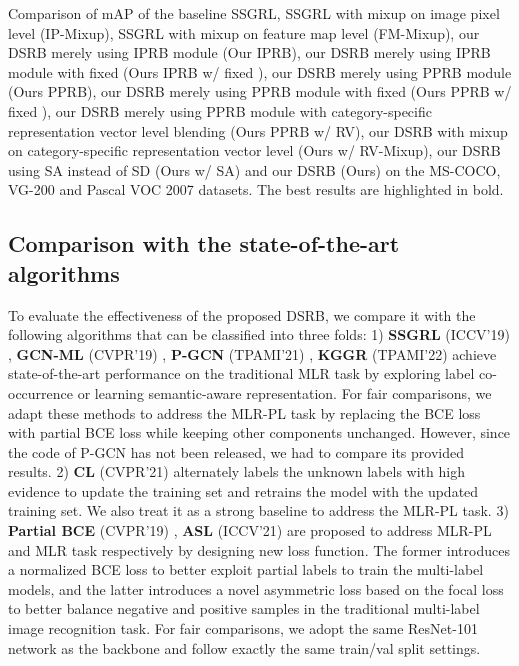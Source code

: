\documentclass[lettersize,journal]{IEEEtran}
\begin{document}
\begin{table*}
  \caption{Comparison of mAP of the baseline SSGRL, SSGRL with mixup on image pixel level (IP-Mixup), SSGRL with mixup on feature map level (FM-Mixup), our DSRB merely using IPRB module (Our IPRB), our DSRB merely using IPRB module with fixed  (Ours IPRB w/ fixed ), our DSRB merely using PPRB module (Ours PPRB), our DSRB merely using PPRB module with fixed  (Ours PPRB w/ fixed ), our DSRB merely using PPRB module with category-specific representation vector level blending (Ours PPRB w/ RV), our DSRB with mixup on category-specific representation vector level (Ours w/ RV-Mixup), our DSRB using SA instead of SD (Ours w/ SA) and our DSRB (Ours) on the MS-COCO, VG-200 and Pascal VOC 2007 datasets. The best results are highlighted in bold.}
  \label{tab:ablation-results}
\end{table*}

\subsection{Comparison with the state-of-the-art algorithms}
To evaluate the effectiveness of the proposed DSRB, we compare it with the following algorithms that can be classified into three folds:  1) \textbf{SSGRL} (ICCV'19) \cite{Chen2019SSGRL}, \textbf{GCN-ML} (CVPR'19) \cite{Chen2019ML-GCN}, \textbf{P-GCN} (TPAMI'21) \cite{Chen2021P-GCN}, \textbf{KGGR} (TPAMI'22) \cite{Chen2022KGGR} achieve state-of-the-art performance on the traditional MLR task by exploring label co-occurrence or learning semantic-aware representation. For fair comparisons, we adapt these methods to address the MLR-PL task by replacing the BCE loss with partial BCE loss while keeping other components unchanged. However, since the code of P-GCN has not been released, we had to compare its provided results. 2) \textbf{CL} (CVPR'21) \cite{Durand2019CVPR} alternately labels the unknown labels with high evidence to update the training set and retrains the model with the updated training set. We also treat it as a strong baseline to address the MLR-PL task. 3) \textbf{Partial BCE} (CVPR'19) \cite{Durand2019CVPR}, \textbf{ASL} (ICCV'21) \cite{Ridnik2021ASL} are proposed to address MLR-PL and MLR task respectively by designing new loss function. The former introduces a normalized BCE loss to better exploit partial labels to train the multi-label models, and the latter introduces a novel asymmetric loss based on the focal loss \cite{lin2017focal-loss} to better balance negative and positive samples in the traditional multi-label image recognition task. For fair comparisons, we adopt the same ResNet-101 network as the backbone and follow exactly the same train/val split settings. 
\end{document}

